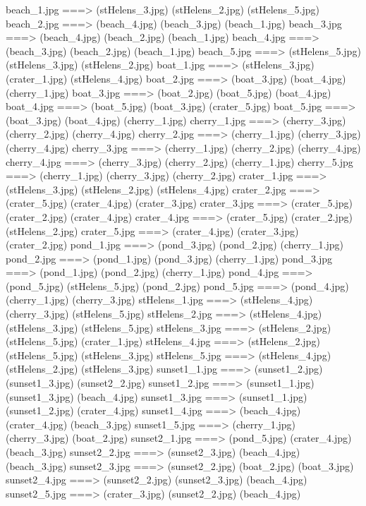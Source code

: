 beach_1.jpg ===>  (stHelens_3.jpg)  (stHelens_2.jpg)  (stHelens_5.jpg) 
beach_2.jpg ===>  (beach_4.jpg)  (beach_3.jpg)  (beach_1.jpg) 
beach_3.jpg ===>  (beach_4.jpg)  (beach_2.jpg)  (beach_1.jpg) 
beach_4.jpg ===>  (beach_3.jpg)  (beach_2.jpg)  (beach_1.jpg) 
beach_5.jpg ===>  (stHelens_5.jpg)  (stHelens_3.jpg)  (stHelens_2.jpg) 
boat_1.jpg ===>  (stHelens_3.jpg)  (crater_1.jpg)  (stHelens_4.jpg) 
boat_2.jpg ===>  (boat_3.jpg)  (boat_4.jpg)  (cherry_1.jpg) 
boat_3.jpg ===>  (boat_2.jpg)  (boat_5.jpg)  (boat_4.jpg) 
boat_4.jpg ===>  (boat_5.jpg)  (boat_3.jpg)  (crater_5.jpg) 
boat_5.jpg ===>  (boat_3.jpg)  (boat_4.jpg)  (cherry_1.jpg) 
cherry_1.jpg ===>  (cherry_3.jpg)  (cherry_2.jpg)  (cherry_4.jpg) 
cherry_2.jpg ===>  (cherry_1.jpg)  (cherry_3.jpg)  (cherry_4.jpg) 
cherry_3.jpg ===>  (cherry_1.jpg)  (cherry_2.jpg)  (cherry_4.jpg) 
cherry_4.jpg ===>  (cherry_3.jpg)  (cherry_2.jpg)  (cherry_1.jpg) 
cherry_5.jpg ===>  (cherry_1.jpg)  (cherry_3.jpg)  (cherry_2.jpg) 
crater_1.jpg ===>  (stHelens_3.jpg)  (stHelens_2.jpg)  (stHelens_4.jpg) 
crater_2.jpg ===>  (crater_5.jpg)  (crater_4.jpg)  (crater_3.jpg) 
crater_3.jpg ===>  (crater_5.jpg)  (crater_2.jpg)  (crater_4.jpg) 
crater_4.jpg ===>  (crater_5.jpg)  (crater_2.jpg)  (stHelens_2.jpg) 
crater_5.jpg ===>  (crater_4.jpg)  (crater_3.jpg)  (crater_2.jpg) 
pond_1.jpg ===>  (pond_3.jpg)  (pond_2.jpg)  (cherry_1.jpg) 
pond_2.jpg ===>  (pond_1.jpg)  (pond_3.jpg)  (cherry_1.jpg) 
pond_3.jpg ===>  (pond_1.jpg)  (pond_2.jpg)  (cherry_1.jpg) 
pond_4.jpg ===>  (pond_5.jpg)  (stHelens_5.jpg)  (pond_2.jpg) 
pond_5.jpg ===>  (pond_4.jpg)  (cherry_1.jpg)  (cherry_3.jpg) 
stHelens_1.jpg ===>  (stHelens_4.jpg)  (cherry_3.jpg)  (stHelens_5.jpg) 
stHelens_2.jpg ===>  (stHelens_4.jpg)  (stHelens_3.jpg)  (stHelens_5.jpg) 
stHelens_3.jpg ===>  (stHelens_2.jpg)  (stHelens_5.jpg)  (crater_1.jpg) 
stHelens_4.jpg ===>  (stHelens_2.jpg)  (stHelens_5.jpg)  (stHelens_3.jpg) 
stHelens_5.jpg ===>  (stHelens_4.jpg)  (stHelens_2.jpg)  (stHelens_3.jpg) 
sunset1_1.jpg ===>  (sunset1_2.jpg)  (sunset1_3.jpg)  (sunset2_2.jpg) 
sunset1_2.jpg ===>  (sunset1_1.jpg)  (sunset1_3.jpg)  (beach_4.jpg) 
sunset1_3.jpg ===>  (sunset1_1.jpg)  (sunset1_2.jpg)  (crater_4.jpg) 
sunset1_4.jpg ===>  (beach_4.jpg)  (crater_4.jpg)  (beach_3.jpg) 
sunset1_5.jpg ===>  (cherry_1.jpg)  (cherry_3.jpg)  (boat_2.jpg) 
sunset2_1.jpg ===>  (pond_5.jpg)  (crater_4.jpg)  (beach_3.jpg) 
sunset2_2.jpg ===>  (sunset2_3.jpg)  (beach_4.jpg)  (beach_3.jpg) 
sunset2_3.jpg ===>  (sunset2_2.jpg)  (boat_2.jpg)  (boat_3.jpg) 
sunset2_4.jpg ===>  (sunset2_2.jpg)  (sunset2_3.jpg)  (beach_4.jpg) 
sunset2_5.jpg ===>  (crater_3.jpg)  (sunset2_2.jpg)  (beach_4.jpg) 
\fi


